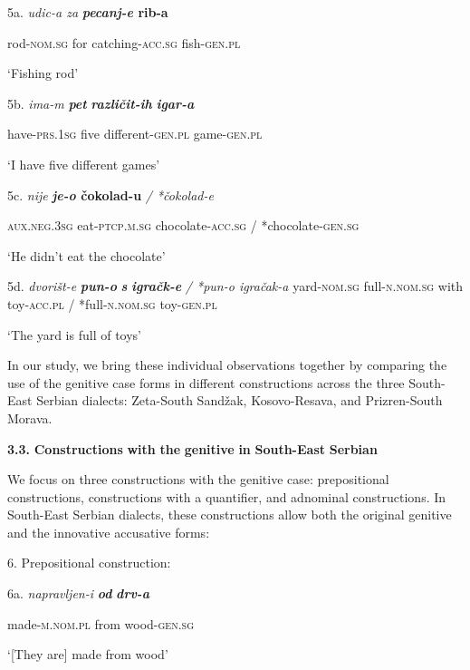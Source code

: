 \documentclass[output=paper]{langscibook}
\begin{document}
5a.   \textit{udic-a               za} \textbf{\textit{pecanj-e}                \textbf{rib-a}}

 rod-\textsc{nom.sg}     for     catching-\textsc{acc.sg}      fish-\textsc{gen.pl}

       ‘Fishing rod’

5b.   \textit{ima-m}   \textbf{\textit{pet}    }  \textbf{\textit{različit-ih}                        }  \textbf{\textit{igar-a}}

       have-\textsc{prs.1sg}           five     different-\textsc{gen.pl}           game-\textsc{gen.pl}

         ‘I have five different games’

5c.     \textit{nije} \textbf{\textit{je-o}                            \textbf{čokolad-u}  } \textit{/    *čokolad-e}

       \textsc{aux.neg.3sg}    eat-\textsc{ptcp.m.sg}           chocolate-\textsc{acc.sg}  / *chocolate-\textsc{gen.sg}

       ‘He didn’t eat the chocolate’

5d.   \textit{dvorišt-e} \textbf{\textit{pun-o}}  \textbf{\textit{s}}  \textbf{\textit{igračk-e} }  \textit{/  *pun-o  igračak-a}  yard-\textsc{nom.sg}  full-\textsc{n.nom.sg}\textbf{  }with    toy-\textsc{acc.pl}    / *full-\textsc{n.nom.sg}  toy-\textsc{gen.pl}

       ‘The yard is full of toys’

In our study, we bring these individual observations together by comparing the use of the genitive case forms in different constructions across the three South-East Serbian dialects: Zeta-South Sandžak, Kosovo-Resava, and Prizren-South Morava.

\textbf{3.3.}  \textbf{Constructions} \textbf{with} \textbf{the} \textbf{genitive} \textbf{in} \textbf{South-East} \textbf{Serbian}

We focus on three constructions with the genitive case: prepositional constructions, constructions with a quantifier, and adnominal constructions. In South-East Serbian dialects, these constructions allow both the original genitive and the innovative accusative forms:

6. Prepositional construction:

6a.    \textit{napravljen-i}   \textbf{\textit{od}}   \textbf{\textit{drv-a}}

     made-\textsc{m.nom.pl}          from                       wood-\textsc{gen.sg}

 ‘[They are] made from wood’
\end{document}
